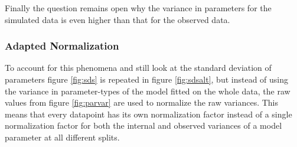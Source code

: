 \documentclass{scrartcl}
\begin{document}
Finally the question remains open why the variance in parameters for the simulated data is even higher than that for the observed data.

\subsubsection{Adapted Normalization}
To account for this phenomena and still look at the standard deviation of parameters figure \ref{fig:sds} is repeated in figure \ref{fig:sdsalt}, but instead of using the variance in parameter-types of the model fitted on the whole data, the raw values from figure \ref{fig:parvar} are used to normalize the raw variances. This means that every datapoint has its own normalization factor instead of a single normalization factor for both the internal and observed variances of a model parameter at all different splits.
\end{document}
